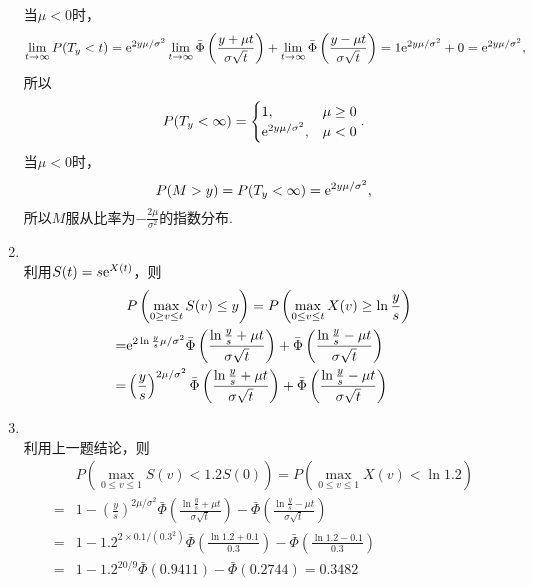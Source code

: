 \begin{enumerate}[label=\arabic{section}.\arabic*]
    当$\mu < 0$时，\[\lim_{t \to \infty}P(T_y<t)=\mathrm{e}^{2y\mu/\sigma^2}\lim_{t \to \infty}\bar{\Phi}\left(\frac{y+\mu t}{\sigma\sqrt{t}}\right)+\lim_{t \to \infty}\bar{\Phi}\left(\frac{y-\mu t}{\sigma\sqrt{t}}\right)=1\mathrm{e}^{2y\mu/\sigma^2}+0=\mathrm{e}^{2y\mu/\sigma^2},\]
    所以\[P(T_y<\infty)=\begin{cases}
        1, & \mu \geq 0 \\ \mathrm{e}^{2y\mu/\sigma^2}, & \mu < 0
    \end{cases}.\]
    当$\mu < 0$时，
    \[P(M > y)=P(T_y<\infty)=\mathrm{e}^{2y\mu/\sigma^2},\]
    所以$M$服从比率为$\displaystyle -\frac{2\mu}{\sigma^2}$的指数分布.
    \item \sol\\
    利用$S(t)=s\mathrm{e}^{X(t)}$，则
    \begin{align*}
        &P\left(\max_{0 \geq v \leq t}S(v) \leq y\right)=P\left(\max_{0 \leq v \leq t}X(v) \geq \ln\frac{y}{s}\right)\\
        =&\mathrm{e}^{2\ln\frac{y}{s}\mu/\sigma^2}\bar{\Phi}\left(\frac{\ln\frac{y}{s}+\mu t}{\sigma\sqrt{t}}\right)+\bar{\Phi}\left(\frac{\ln\frac{y}{s}-\mu t}{\sigma\sqrt{t}}\right)\\
        =&\left(\frac{y}{s}\right)^{2\mu/\sigma^2}\bar{\Phi}\left(\frac{\ln\frac{y}{s}+\mu t}{\sigma\sqrt{t}}\right)+\bar{\Phi}\left(\frac{\ln\frac{y}{s}-\mu t}{\sigma\sqrt{t}}\right)
    \end{align*}
    \item \sol\\
    利用上一题结论，则
    \begin{align*}
        &P\left(\max_{0 \leq v \leq 1}S(v) < 1.2S(0)\right)=P\left(\max_{0 \leq v \leq 1}X(v) < \ln 1.2\right)\\
        =&1-\left(\frac{y}{s}\right)^{2\mu/\sigma^2}\bar{\Phi}\left(\frac{\ln\frac{y}{s}+\mu t}{\sigma\sqrt{t}}\right)-\bar{\Phi}\left(\frac{\ln\frac{y}{s}-\mu t}{\sigma\sqrt{t}}\right)\\
        =&1-1.2^{2\times0.1/(0.3^2)}\bar{\Phi}\left(\frac{\ln 1.2+0.1}{0.3}\right)-\bar{\Phi}\left(\frac{\ln1.2-0.1}{0.3}\right)\\
        =&1-1.2^{20/9}\bar{\Phi}(0.9411)-\bar{\Phi}(0.2744)=0.3482
    \end{align*}
\end{enumerate}
\clearpage